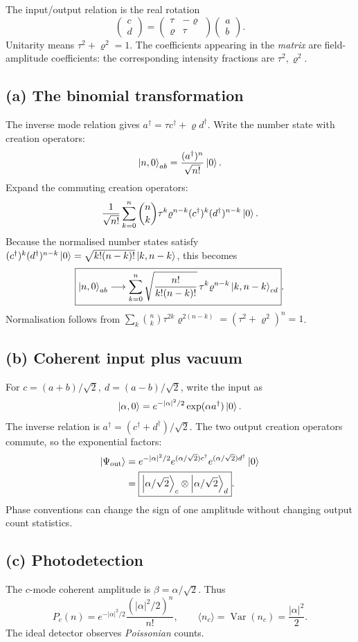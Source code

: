 
The input/output relation is the real rotation
\[
\begin{pmatrix}c\\d\end{pmatrix}
=\begin{pmatrix}\tau&-\varrho\\\varrho&\tau\end{pmatrix}
\begin{pmatrix}a\\b\end{pmatrix}.
\]
Unitarity means \(\tau^2+\varrho^2=1\).
The coefficients appearing in the \emph{matrix}
are field-amplitude coefficients: the corresponding
intensity fractions are \(\tau^2,\varrho^2\).

\subsection*{(a) The binomial transformation}
The inverse mode relation gives
\(a^\dagger=\tau c^\dagger+\varrho d^\dagger\).
Write the number state with creation operators:
\[
\left\lvert n,0\right\rangle_{ab}=\frac{(a^\dagger)^n}{\sqrt{n!}}\left\lvert 0\right\rangle.
\]
Expand the commuting creation operators:
\[
\frac1{\sqrt{n!}}\sum_{k=0}^n\binom nk
\tau^k\varrho^{n-k}
(c^\dagger)^k(d^\dagger)^{n-k}\left\lvert 0\right\rangle.
\]
Because the normalised number states satisfy
\((c^\dagger)^k(d^\dagger)^{n-k}\left\lvert 0\right\rangle
=\sqrt{k!(n-k)!}\left\lvert k,n-k\right\rangle\), this becomes
\[
\boxed{\left\lvert n,0\right\rangle_{ab}\longrightarrow
\sum_{k=0}^n
\sqrt{\frac{n!}{k!(n-k)!}}\,
\tau^k\varrho^{n-k}\left\lvert k,n-k\right\rangle_{cd}}.
\]
Normalisation follows from
\(\sum_k\binom nk\tau^{2k}\varrho^{2(n-k)}
=(\tau^2+\varrho^2)^n=1\).

\subsection*{(b) Coherent input plus vacuum}
For \(c=(a+b)/\sqrt2,\ d=(a-b)/\sqrt2\),
write the input as
\[
\left\lvert \alpha,0\right\rangle=e^{-|\alpha|^2/2}
\exp(\alpha a^\dagger)\left\lvert 0\right\rangle.
\]
The inverse relation is
\(a^\dagger=(c^\dagger+d^\dagger)/\sqrt2\).
The two output creation operators commute, so
the exponential factors:
\[
\begin{aligned}
\left\lvert \Psi_{\rm out}\right\rangle
&=e^{-|\alpha|^2/2}
e^{(\alpha/\sqrt2)c^\dagger}
e^{(\alpha/\sqrt2)d^\dagger}\left\lvert 0\right\rangle\\
&=\boxed{\left\lvert \alpha/\sqrt2\right\rangle_c\otimes
\left\lvert \alpha/\sqrt2\right\rangle_d}.
\end{aligned}
\]
Phase conventions can change the sign of one
amplitude without changing output count statistics.

\subsection*{(c) Photodetection}
The \(c\)-mode coherent amplitude is
\(\beta=\alpha/\sqrt2\).
Thus
\[
\boxed{P_c(n)=
e^{-|\alpha|^2/2}\frac{(|\alpha|^2/2)^n}{n!}},
\qquad
\boxed{\langle n_c\rangle=\operatorname{Var}(n_c)
=\frac{|\alpha|^2}{2}}.
\]
The ideal detector observes \emph{Poissonian} counts.
